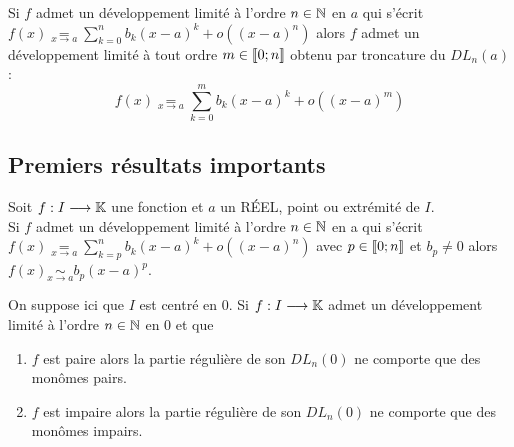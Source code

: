 \begin{defprop}
    Si \(f\) admet un développement limité à l’ordre \(n \in  \mathbb{N}\) en \(a\) qui s’écrit \(f (x) \underset{x\to a}{=} \sum^n_{k=0} b_k(x - a)^k +o ((x - a)^n)\)
    alors \(f\) admet un développement limité à tout ordre \(m \in  \left\llbracket0;n\right\rrbracket\) obtenu par troncature du \(DL_n(a)\) :
    \[f (x) \underset{x\to a}{=} \sum^m_{ k=0} b_k(x - a)^k + o ((x - a)^m)\] 
\end{defprop}

\subsection{Premiers résultats importants}
\begin{defprop}
    Soit \(f : I \longrightarrow  \mathbb{K}\) une fonction et \(a\) un RÉEL, point ou extrémité de \(I\).\\
    Si \(f\) admet un développement limité à l’ordre \(n \in  \mathbb{N}\) en a qui s’écrit \(f (x) \underset{x\to a}{=}\sum^n_{k=p} b_k(x - a)^k +o ((x - a)^n)\) avec \(p \in  \left\llbracket0;n\right\rrbracket \) et \(b_p\neq 0\) alors \(f (x) \underset{x \to a}{\sim} b_p(x - a)^p\).
\end{defprop}

\begin{defprop}
    On suppose ici que \(I\) est centré en \(0\).
Si \(f : I \longrightarrow  \mathbb{K}\) admet un développement limité à l’ordre \(n \in  \mathbb{N}\) en \(0\) et que
    \begin{enumerate}
        \item \(f\) est paire alors la partie régulière de son \(DL_n(0)\) ne comporte que des monômes pairs.
        \item \(f\) est impaire alors la partie régulière de son \( DL_n(0)\) ne comporte que des monômes impairs.
    \end{enumerate}

\end{defprop}

